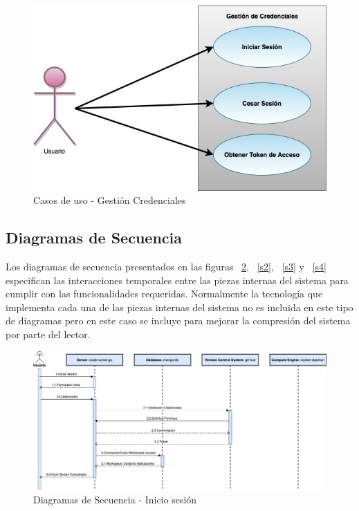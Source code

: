 \documentclass[a4paper,11pt]{book}
\begin{document}
\begin{figure}[H]
\centering
\includegraphics[scale=0.50]{imagenes/casosUso3.jpg}
\caption{ Casos de uso - Gestión Credenciales~\cite{diagrama}  }
\label{c3}
\end{figure}

\subsection{Diagramas de Secuencia}
Los diagramas de secuencia presentados en las figuras ~\ref{s1}, ~\ref{s2}, ~\ref{s3}  y ~\ref{s4} especifican las interacciones temporales entre las piezas internas del sistema para cumplir con las funcionalidades requeridas. Normalmente la tecnología que implementa cada una de las piezas internas del sistema no es incluida en este tipo de diagramas pero en este caso se incluye para mejorar la compresión del sistema por parte del lector. 


\begin{figure}[H]
\centering
\includegraphics[scale=0.45]{imagenes/secuencia1.jpg}
\caption{ Diagramas de Secuencia - Inicio sesión ~\cite{diagrama}  }
\label{s1}
\end{figure}
\end{document}
